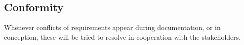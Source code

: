 \subsection{Conformity}
Whenever conflicts of requirements appear during documentation, or in conception, these will be tried to resolve in cooperation with the stakeholders. 





    
    
